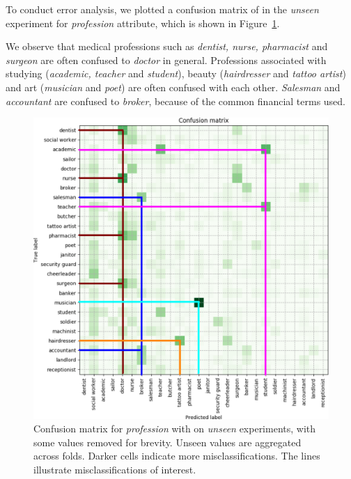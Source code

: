 To conduct error analysis, we plotted a confusion matrix of  in the \emph{unseen} experiment for \emph{profession} attribute, which is shown in Figure~\ref{conf_prof}.

We observe that medical professions such as \textit{dentist, nurse, pharmacist} and \emph{surgeon} are often confused to \textit{doctor} in general. Professions associated with studying (\textit{academic, teacher} and \emph{student}), beauty (\textit{hairdresser} and \emph{tattoo artist}) and art (\textit{musician} and \textit{poet}) are often confused with each other. \textit{Salesman} and \emph{accountant} are confused to \textit{broker}, because of the common financial terms used. 


\begin{figure}[h!]
 \centering
   \centering
   \includegraphics[scale=0.5]{imgs/profession_confusion.pdf}
\vspace{0.3cm}
\caption{Confusion matrix for \emph{profession}  with  on \emph{unseen} experiments, with some values removed for brevity. Unseen values are aggregated across folds. 
Darker cells indicate more misclassifications. The lines illustrate misclassifications of interest.
}
   \label{conf_prof}
\end{figure}

